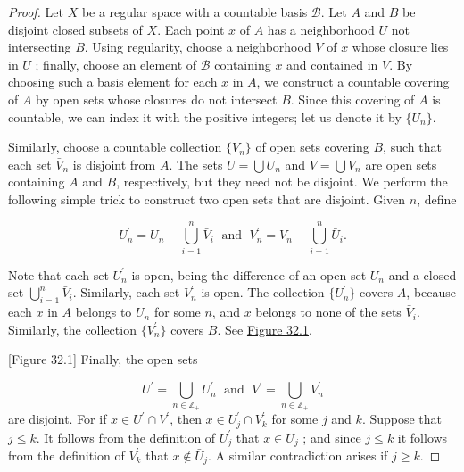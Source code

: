 \begin{proof}
Let \(X\) be a regular space with a countable basis \(\mathcal{B}\). Let \(A\) and \(B\) be disjoint closed subsets of \(X\). Each point \(x\) of \(A\) has a neighborhood \(U\) not intersecting \(B\). Using regularity, choose a neighborhood \(V\) of \(x\) whose closure lies in \(U\) ; finally, choose an element of \(\mathcal{B}\) containing \(x\) and contained in \(V\). By choosing such a basis element for each \(x\) in \(A\), we construct a countable covering of \(A\) by open sets whose closures do not intersect \(B\). Since this covering of \(A\) is countable, we can index it with the positive integers; let us denote it by \(\{ U_{n}\}\).

Similarly, choose a countable collection \(\{ V_{n}\}\) of open sets covering \(B\), such that each set \(\bar{V}_{n}\) is disjoint from \(A\). The sets \(U = \bigcup {U}_{n}\) and \(V = \bigcup {V}_{n}\) are open sets containing \(A\) and \(B\), respectively, but they need not be disjoint. We perform the following simple trick to construct two open sets that are disjoint. Given \(n\), define

\[
U_n^{\prime } = U_{n} - \mathop{\bigcup }\limits_{{i = 1}}^{n}\bar{V}_{i}\;\text{ and }\;V_n^{\prime } = V_{n} - \mathop{\bigcup }\limits_{{i = 1}}^{n}\bar{U}_{i}.
\]

Note that each set \(U_n^{\prime }\) is open, being the difference of an open set \(U_{n}\) and a closed set \(\mathop{\bigcup }\limits_{{i = 1}}^{n}\bar{V}_{i}\). Similarly, each set \(V_n^{\prime }\) is open. The collection \(\{ U_n^{\prime }\}\) covers \(A\), because each \(x\) in \(A\) belongs to \(U_{n}\) for some \(n\), and \(x\) belongs to none of the sets \(\bar{V}_{i}\). Similarly, the collection \(\{ V_n^{\prime }\}\) covers \(B\). See \hyperref[fig:32.1]{Figure 32.1}.

[Figure 32.1]
Finally, the open sets

\[
U^{\prime } = \mathop{\bigcup }\limits_{{n \in {\mathbb{Z}}_{ + }}}U_n^{\prime }\;\text{ and }\;V^{\prime } = \mathop{\bigcup }\limits_{{n \in {\mathbb{Z}}_{ + }}}V_n^{\prime }
\]
are disjoint. For if \(x \in {U}^{\prime } \cap {V}^{\prime }\), then \(x \in {U}_j^{\prime } \cap {V}_k^{\prime }\) for some \(j\) and \(k\). Suppose that \(j \leq k\). It follows from the definition of \(U_j^{\prime }\) that \(x \in {U}_{j}\) ; and since \(j \leq k\) it follows from the definition of \(V_k^{\prime }\) that \(x \notin {\bar{U}}_{j}\). A similar contradiction arises if \(j \geq k\).
\end{proof}

